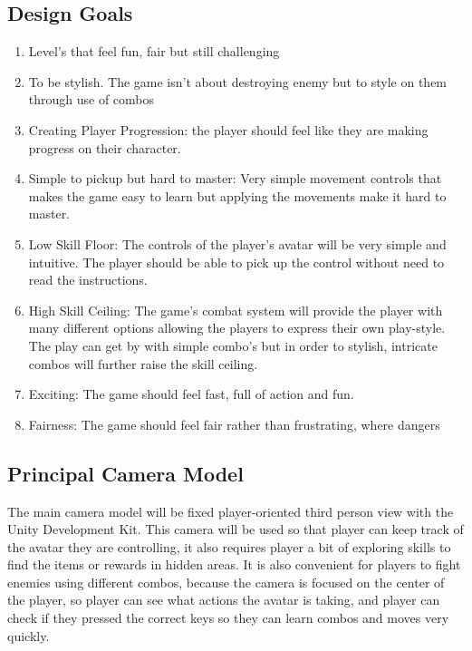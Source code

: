 \documentclass{article}
\begin{document}
\subsection*{Design Goals}
    \begin{enumerate}
        \item Level's that feel fun, fair but still challenging
        \item To be stylish. The game isn't about destroying enemy but to style on them through use of combos
        \item Creating Player Progression: the player should feel like they are making progress on their character. 
        \item Simple to pickup but hard to master:  Very simple movement controls that makes the game easy to learn but applying the movements make it hard to master.
        \item Low Skill Floor: The controls of the player's avatar will be very simple and intuitive. The player should be able to pick up the control without need to read the instructions.
        \item High Skill Ceiling: The game's combat system will provide the player with many different options allowing the players to express their own play-style. The play can get by with simple combo's but in order to stylish, intricate combos will further raise the skill ceiling.
        \item Exciting: The game should feel fast, full of action and fun.
        \item Fairness: The game should feel fair rather than frustrating, where dangers 
    \end{enumerate}



    
\subsection*{Principal Camera Model}
The main camera model will be fixed player-oriented third person view with the Unity Development Kit. This camera will be used so that player can keep track of the avatar they are controlling, it also requires player a bit of exploring skills to find the items or rewards in hidden areas. It is also convenient for players to fight enemies using different combos, because the camera is focused on the center of the player, so player can see what actions the avatar is taking, and player can check if they pressed the correct keys so they can learn combos and moves very quickly.
\end{document}

